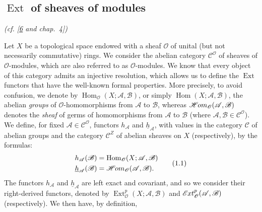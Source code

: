 \documentclass{article}
\theoremstyle{definition}
\theoremstyle{definition}
\theoremstyle{definition}
\theoremstyle{definition}
\theoremstyle{remark}
\begin{document}
\hypertarget{fga-1-section-1}{%
\subsection{\texorpdfstring{\(\operatorname{Ext}\) of sheaves of modules}{\textbackslash operatorname\{Ext\} of sheaves of modules}}\label{fga-1-section-1}}

\emph{(cf. {[}\protect\hyperlink{ref-Gro1957}{6} and chap.~4{]})}

Let \(X\) be a topological space endowed with a sheaf \({\mathscr{O}}\) of unital (but not necessarily commutative) rings.
We consider the abelian category \({\mathcal{C}}^{\mathscr{O}}\) of sheaves of \({\mathscr{O}}\)-modules, which are also referred to as \({\mathscr{O}}\)-modules.
We know that every object of this category admits an injective resolution, which allows us to define the \(\operatorname{Ext}\) functors that have the well-known formal properties.
More precisely, to avoid confusion, we denote by \(\operatorname{Hom}_{\mathscr{O}}(X;{\mathscr{A}},{\mathscr{B}})\), or simply \(\operatorname{Hom}(X;{\mathscr{A}},{\mathscr{B}})\), the abelian \emph{groups} of \({\mathscr{O}}\)-homomorphisms from \({\mathscr{A}}\) to \({\mathscr{B}}\), whereas \(\mathscr{H}\kern -.5pt om_{\mathscr{O}}({\mathscr{A}},{\mathscr{B}})\) denotes the \emph{sheaf} of germs of homomorphisms from \({\mathscr{A}}\) to \({\mathscr{B}}\) (where \({\mathscr{A}},{\mathscr{B}}\in {\mathcal{C}}^{\mathscr{O}}\)).
We define, for fixed \({\mathscr{A}}\in {\mathcal{C}}^{\mathscr{O}}\), functors \(h_{\mathscr{A}}\) and \(\underline{h}_{\mathscr{A}}\), with values in the category \({\mathcal{C}}\) of abelian groups and the category \({\mathcal{C}}^Z\) of abelian sheaves on \(X\) (respectively), by the formulas:
\[
  \begin{aligned}
    h_{\mathscr{A}}({\mathscr{B}}) &= \operatorname{Hom}_{\mathscr{O}}(X;{\mathscr{A}},{\mathscr{B}})
  \\\underline{h}_{\mathscr{A}}({\mathscr{B}}) &= \mathscr{H}\kern -.5pt om_{\mathscr{O}}({\mathscr{A}},{\mathscr{B}}).
  \end{aligned}
\tag{1.1}
\]
The functors \(h_{\mathscr{A}}\) and \(\underline{h}_{\mathscr{A}}\) are left exact and covariant, and so we consider their right-derived functors, denoted by \(\operatorname{Ext}_{\mathscr{O}}^p(X;{\mathscr{A}},{\mathscr{B}})\) and \(\mathscr{E}\kern -.5pt xt_{\mathscr{O}}^p({\mathscr{A}},{\mathscr{B}})\) (respectively).
We then have, by definition,
\end{document}
